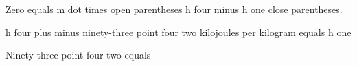 Zero equals m dot times open parentheses h four minus h one close parentheses. 

h four plus minus ninety-three point four two kilojoules per kilogram equals h one

Ninety-three point four two equals